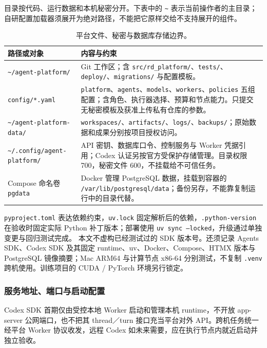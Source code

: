 \documentclass[11pt,a4paper]{article}
\begin{document}
目录按代码、运行数据和本机秘密分开。下表中的 \texttt{\textasciitilde} 表示当前操作者的主目录；自研配置加载器须展开为绝对路径，不能把它原样交给不支持展开的组件。

\begin{table}[H]
\centering\small\renewcommand{\arraystretch}{1.14}
\begin{tabularx}{\textwidth}{P{5.0cm}L}
\toprule
\textbf{路径或对象} & \textbf{内容与约束}\\
\midrule
\texttt{\textasciitilde/agent-platform/} & Git 工作区；含 \texttt{src/rd\_platform/}、\texttt{tests/}、\texttt{deploy/}、\texttt{migrations/} 与配置模板。\\
\texttt{config/*.yaml} & \texttt{platform}、\texttt{agents}、\texttt{models}、\texttt{workers}、\texttt{policies} 五组配置；含角色、执行器选择、预算和节点能力。只提交无秘密模板及获准上传私有仓库的参数。\\
\texttt{\textasciitilde/agent-platform-data/} & \texttt{workspaces/}、\texttt{artifacts/}、\texttt{logs/}、\texttt{backups/}；原始数据和成果分别按项目授权访问。\\
\texttt{\textasciitilde/.config/agent-platform/} & API 密钥、数据库口令、控制服务与 Worker 凭据引用；Codex 认证另按官方受保护存储管理。目录权限 700，秘密文件 600，不挂载给不可信任务。\\
Compose 命名卷 \texttt{pgdata} & Docker 管理 PostgreSQL 数据，挂载到容器的 \texttt{/var/lib/postgresql/data}；备份另存，不能靠复制运行中的目录代替。\\
\bottomrule
\end{tabularx}
\caption{平台文件、秘密与数据库存储边界。}
\end{table}

\texttt{pyproject.toml} 表达依赖约束，\texttt{uv.lock} 固定解析后的依赖，\texttt{.python-version} 在验收时固定实际 Python 补丁版本；部署使用 \texttt{uv sync --locked}，升级通过单独变更与回归测试完成。\cite{ch5-uv-project} 本文不虚构已经测试过的 SDK 版本号。还须记录 Agents SDK、Codex SDK 及其固定 runtime、uv、Docker、Compose、HTMX 版本与 PostgreSQL 镜像摘要；Mac ARM64 与计算节点 x86-64 分别测试，不复制 \texttt{.venv} 跨机使用。训练项目的 CUDA / PyTorch 环境另行锁定。

\subsubsection{服务地址、端口与启动配置}

Codex SDK 首期仅由受控本地 Worker 启动和管理本机 runtime，不开放 app-server 公网端口，也不把其 thread／turn 接口充当平台对外 API。跨机任务统一经平台 Worker 协议收发，远程 Codex 如未来需要，应在执行节点内就近启动并独立验收。\cite{codex-app}
\end{document}
